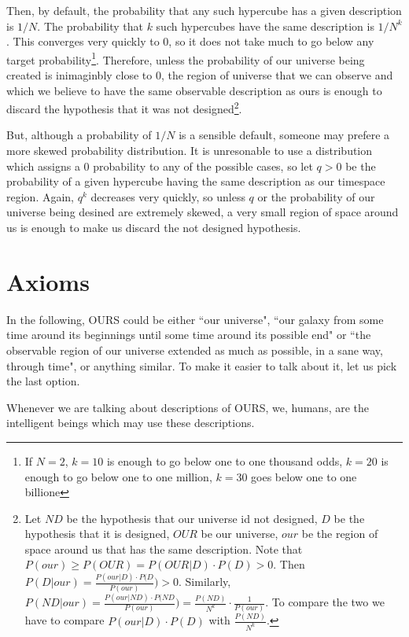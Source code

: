 \documentclass[a4paper
,draft
]{article}
\newcommand{\ghilimele}[1]{``#1"}
\begin{document}
Then, by default, the probability that any such hypercube has a given description is $1/N$. The probability that $k$ such hypercubes have the same description is $1/N^k$. This converges very quickly to $0$, so it does not take much to go below any target probability\footnote{If $N=2$, $k=10$ is enough to go below one to one thousand odds, $k=20$ is enough to go below one to one million, $k=30$ goes below one to one billione}. Therefore, unless the probability of our universe being created is inimaginbly close to $0$, the region of universe that we can observe and which we believe to have the same observable description as ours is enough to discard the hypothesis that it was not designed\footnote{Let $ND$ be the hypothesis that our universe id not designed, $D$ be the hypothesis that it is designed, $OUR$ be our universe, $our$ be the region of space around us that has the same description. Note that $P(our) \ge P(OUR)=P(OUR|D)\cdot P(D) > 0$. Then $P(D|our) = \frac{P(our|D)\cdot P(D}{P(our)}) > 0$. Similarly, $P(ND|our) = \frac{P(our|ND)\cdot P(ND}{P(our)}) = \frac{P(ND)}{N^k} \cdot \frac{1}{P(our)}$. To compare the two we have to compare $P(our|D)\cdot P(D)$ with $\frac{P(ND)}{N^k}$.}. 

But, although a probability of $1/N$ is a sensible default, someone may prefere
a more skewed probability distribution. It is unresonable to use a distribution
which assigns a $0$ probability to any of the possible cases, so let $q > 0$ be
the probability of a given hypercube having the same description as our
timespace region. Again, $q^k$ decreases very quickly, so unless $q$ or the
probability of our universe being desined are extremely skewed, a very small
region of space around us is enough to make us discard the not designed hypothesis.

\section{Axioms}

In the following, OURS could be either \ghilimele{our universe}, \ghilimele{our galaxy from some time around its beginnings until some time around its possible end} or \ghilimele{the observable region of our universe extended as much as possible, in a sane way, through time}, or anything similar. To make it easier to talk about it, let us pick the last option.

Whenever we are talking about descriptions of OURS, we, humans, are the intelligent beings which may use these descriptions.
\end{document}
